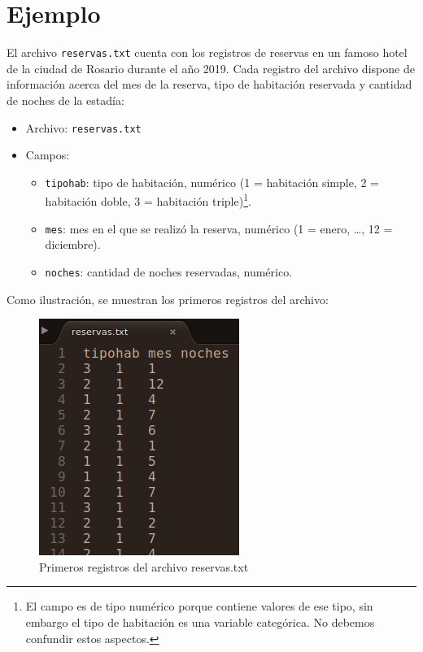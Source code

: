 \documentclass[
]{book}
\providecommand{\tightlist}{%
  \setlength{\itemsep}{0pt}\setlength{\parskip}{0pt}}
\begin{document}
\hypertarget{ejemplo}{%
\section{Ejemplo}\label{ejemplo}}

El archivo \texttt{reservas.txt} cuenta con los registros de reservas en un famoso hotel de la ciudad de Rosario durante el año 2019. Cada registro del archivo dispone de información acerca del mes de la reserva, tipo de habitación reservada y cantidad de noches de la estadía:

\begin{itemize}
\item
  Archivo: \texttt{reservas.txt}
\item
  Campos:

  \begin{itemize}
  \tightlist
  \item
    \texttt{tipohab}: tipo de habitación, numérico (1 = habitación simple, 2 = habitación doble, 3 = habitación triple)\footnote{El campo es de tipo numérico porque contiene valores de ese tipo, sin embargo el tipo de habitación es una variable categórica. No debemos confundir estos aspectos.}.
  \item
    \texttt{mes}: mes en el que se realizó la reserva, numérico (1 = enero, \ldots, 12 = diciembre).
  \item
    \texttt{noches}: cantidad de noches reservadas, numérico.
  \end{itemize}
\end{itemize}

Como ilustración, se muestran los primeros registros del archivo:

\begin{figure}

{\centering \includegraphics[width=0.3\linewidth]{images/06_archivos/arch00} 

}

\caption{Primeros registros del archivo reservas.txt}\label{fig:unnamed-chunk-137}
\end{figure}
\end{document}
